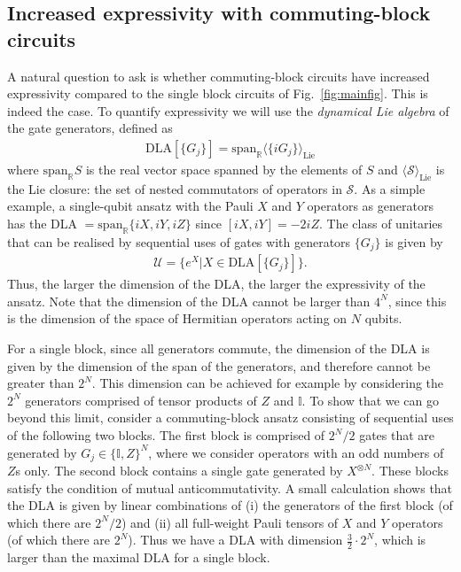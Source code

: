 \documentclass[a4paper,twocolumn,11pt,accepted=2025-09-06]{quantumarticle}
\begin{document}
\subsection{Increased expressivity with commuting-block circuits}\label{sec:increasedexpressivity}
A natural question to ask is whether commuting-block circuits have increased expressivity compared to the single block circuits of Fig.\ \ref{fig:mainfig}. This is indeed the case. To quantify expressivity we will use the \emph{dynamical Lie algebra} \cite{ragoneunified} of the gate generators, defined as 
%
\begin{align}\label{DLA}
    \text{DLA}[\{G_j\}] = \text{span}_\mathbb{R}\langle\{iG_j\}\rangle_{\text{Lie}}
\end{align}
%
where $\text{span}_\mathbb{R} S$ is the real vector space spanned by the elements of $S$ and $\langle \mathcal{S} \rangle_{\text{Lie}}$ is the Lie closure: the set of nested commutators of operators in $\mathcal{S}$. As a simple example, a single-qubit ansatz with the Pauli $X$ and $Y$ operators as generators has the DLA $=\text{span}_\mathbb{R}\{iX,iY,iZ\}$ since $[iX,iY]=-2iZ$. The class of unitaries that can be realised by sequential uses of gates with generators $\{G_j\}$ is given by \cite{controlbook,larocca2022diagnosing}
%
\begin{align}\label{UDLA}
    \mathcal{U} = \{e^{X} \vert X\in \text{DLA}[\{G_j\}] \}.
\end{align}
%
Thus, the larger the dimension of the DLA, the larger the expressivity of the ansatz. Note that the dimension of the DLA cannot be larger than $4^N$, since this is the dimension of the space of Hermitian operators acting on $N$ qubits. 
%
%

For a single block, since all generators commute, the dimension of the DLA is given by the dimension of the span of the generators, and therefore cannot be greater than $2^N$. This dimension can be achieved for example by considering the $2^N$ generators comprised of tensor products of $Z$ and $\mathbb{I}$. 
To show that we can go beyond this limit, consider a commuting-block ansatz consisting of sequential uses of the following two blocks. The first block is comprised of $2^N/2$ gates that are generated by $G_j\in\{\mathbb{I}, Z\}^N$, where we consider operators with an odd numbers of $Z$s only. The second block contains a single gate generated by $X^{\otimes N}$.
These blocks satisfy the condition of mutual anticommutativity. A small calculation shows that the DLA is given by linear combinations of (i) the generators of the first block (of which there are $2^N/2$) and (ii) all full-weight Pauli tensors of $X$ and $Y$ operators (of which there are $2^N$). Thus we have a DLA with dimension $\frac{3}{2}\cdot 2^N$, which is larger than the maximal DLA for a single block. 
\end{document}

